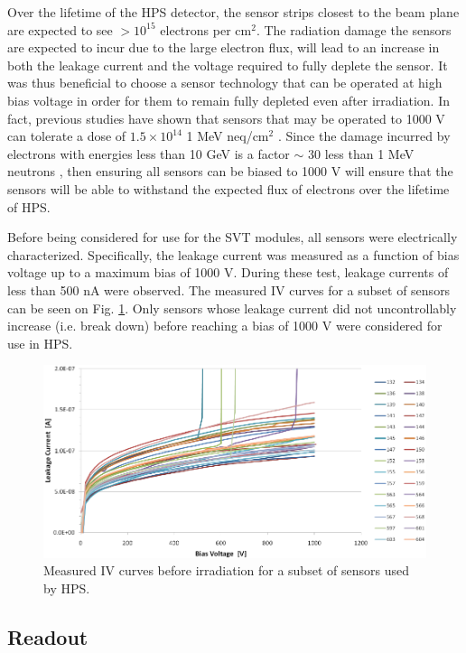 Over the lifetime of the HPS detector, the sensor strips closest to the beam 
plane are expected to see $>10^{15}$ electrons per cm$^2$.  The radiation
damage the sensors are expected to incur due to the large electron flux,
will lead to an increase in both the leakage current and the voltage required to 
fully deplete the sensor.  It was thus beneficial to choose a sensor technology
that can be operated at high bias voltage in order for them to remain fully
depleted even after irradiation. In fact, previous studies have shown that 
sensors that may be operated to 1000 V can tolerate a dose of 
$1.5 \times 10^{14}$ 1 MeV neq/cm$^2$ \cite{Fretwurst:2002vb}.  Since the damage
incurred by electrons with energies less than 10 GeV is a factor $\sim$ 30 less
than 1 MeV neutrons \cite{Rashevskaya:2002nd},
then ensuring all sensors can be biased to 1000 V will ensure that the sensors
will be able to withstand the expected flux of electrons over the lifetime of
HPS. 


Before being considered for use for the SVT modules, all sensors were electrically 
characterized.  Specifically, the leakage current was measured as a function
of bias voltage up to a maximum bias of 1000 V.  During these test, leakage 
currents of less than 500 nA were observed.  The measured IV curves for a subset
of sensors can be seen on Fig. \ref{fig:sensor_iv_curves}.  Only sensors whose
leakage current did not uncontrollably increase (i.e. break down) before reaching
a bias of 1000 V  were considered for use in HPS.
\begin{figure}[t!]
    \centering
    \includegraphics[width=\textwidth]{images/sensor_iv_curves.png}
    \caption{Measured IV curves before irradiation for a subset of sensors used by HPS.}
    \label{fig:sensor_iv_curves}
\end{figure}

\subsection{Readout} \label{subsec:readout}

